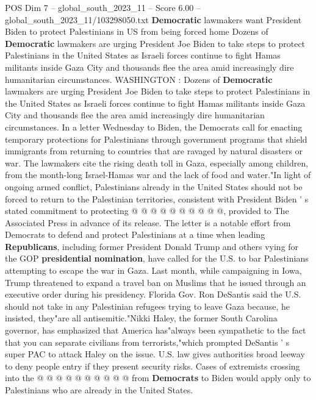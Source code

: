 \begin{textsample}{POS Dim 7 – global\_south\_2023\_11 – Score 6.00 – global\_south\_2023\_11/103298050.txt}  \label{ex:f7_pos_304}
\textbf{Democratic} lawmakers want President Biden to protect Palestinians in US from being forced home Dozens of \textbf{Democratic} lawmakers are urging President Joe Biden to take steps to protect Palestinians in the United States as Israeli forces continue to fight Hamas militants inside Gaza City and thousands flee the area amid increasingly dire humanitarian circumstances.
WASHINGTON : Dozens of \textbf{Democratic} lawmakers are urging President Joe Biden to take steps to protect Palestinians in the United States as Israeli forces continue to fight Hamas militants inside Gaza City and thousands flee the area amid increasingly dire humanitarian circumstances.
In a letter Wednesday to Biden, the Democrats call for enacting temporary protections for Palestinians through government programs that shield immigrants from returning to countries that are ravaged by natural disasters or war.
The lawmakers cite the rising death toll in Gaza, especially among children, from the month-long Israel-Hamas war and the lack of food and water."In light of ongoing armed conflict, Palestinians already in the United States should not be forced to return to the Palestinian territories, consistent with President Biden ' s stated commitment to protecting @ @ @ @ @ @ @ @ @ @, provided to The Associated Press in advance of its release.
The letter is a notable effort from Democrats to defend and protect Palestinians at a time when leading \textbf{Republicans}, including former President Donald Trump and others vying for the GOP \textbf{presidential} \textbf{nomination}, have called for the U.S. to bar Palestinians attempting to escape the war in Gaza.
Last month, while campaigning in Iowa, Trump threatened to expand a travel ban on Muslims that he issued through an executive order during his presidency.
Florida Gov.
Ron DeSantis said the U.S. should not take in any Palestinian refugees trying to leave Gaza because, he insisted, they"are all antisemitic."Nikki Haley, the former South Carolina governor, has emphasized that America has"always been sympathetic to the fact that you can separate civilians from terrorists,"which prompted DeSantis ' s super PAC to attack Haley on the issue.
U.S. law gives authorities broad leeway to deny people entry if they present security risks.
Cases of extremists crossing into the @ @ @ @ @ @ @ @ @ @ from \textbf{Democrats} to Biden would apply only to Palestinians who are already in the United States.

\end{textsample}

